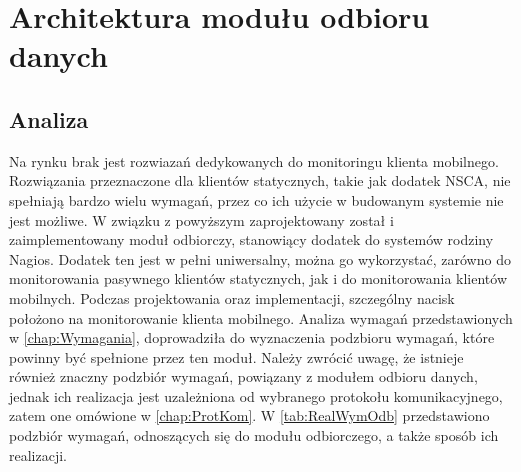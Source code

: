 \chapter{Architektura modułu odbioru danych}
\label{chap:ArchDaemona}

\section[Analiza][Analiza]{Analiza}

Na rynku brak jest rozwiazań dedykowanych do monitoringu klienta
mobilnego. Rozwiązania przeznaczone dla klientów statycznych, takie
jak dodatek NSCA, nie spełniają bardzo wielu wymagań, przez co ich
użycie w budowanym systemie nie jest możliwe. W związku z powyższym
zaprojektowany został i zaimplementowany moduł odbiorczy, stanowiący
dodatek do systemów rodziny Nagios. Dodatek ten jest w pełni
uniwersalny, można go wykorzystać, zarówno do monitorowania pasywnego
klientów statycznych, jak i do monitorowania klientów
mobilnych. Podczas projektowania oraz implementacji, szczególny nacisk
położono na monitorowanie klienta mobilnego. Analiza wymagań
przedstawionych w \ref{chap:Wymagania}, doprowadziła do wyznaczenia
podzbioru wymagań, które powinny być spełnione przez ten moduł. Należy
zwrócić uwagę, że istnieje również znaczny podzbiór wymagań, powiązany
z modułem odbioru danych, jednak ich realizacja jest uzależniona od
wybranego protokołu komunikacyjnego, zatem one omówione w
\ref{chap:ProtKom}. W \ref{tab:RealWymOdb} przedstawiono podzbiór
wymagań, odnoszących się do modułu odbiorczego, a także sposób ich
realizacji.

